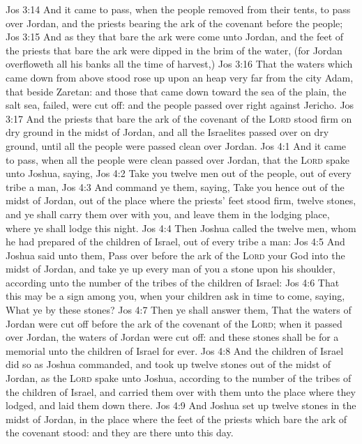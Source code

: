 \vs Jos 3:14 And it came to pass, when the people removed from their tents, to pass over Jordan, and the priests bearing the ark of the covenant before the people;
\vs Jos 3:15 And as they that bare the ark were come unto Jordan, and the feet of the priests that bare the ark were dipped in the brim of the water, (for Jordan overfloweth all his banks all the time of harvest,)
\vs Jos 3:16 That the waters which came down from above stood  rose up upon an heap very far from the city Adam, that  beside Zaretan: and those that came down toward the sea of the plain,  the salt sea, failed,  were cut off: and the people passed over right against Jericho.
\vs Jos 3:17 And the priests that bare the ark of the covenant of the \textsc{Lord} stood firm on dry ground in the midst of Jordan, and all the Israelites passed over on dry ground, until all the people were passed clean over Jordan.
\vs Jos 4:1 And it came to pass, when all the people were clean passed over Jordan, that the \textsc{Lord} spake unto Joshua, saying,
\vs Jos 4:2 Take you twelve men out of the people, out of every tribe a man,
\vs Jos 4:3 And command ye them, saying, Take you hence out of the midst of Jordan, out of the place where the priests' feet stood firm, twelve stones, and ye shall carry them over with you, and leave them in the lodging place, where ye shall lodge this night.
\vs Jos 4:4 Then Joshua called the twelve men, whom he had prepared of the children of Israel, out of every tribe a man:
\vs Jos 4:5 And Joshua said unto them, Pass over before the ark of the \textsc{Lord} your God into the midst of Jordan, and take ye up every man of you a stone upon his shoulder, according unto the number of the tribes of the children of Israel:
\vs Jos 4:6 That this may be a sign among you,  when your children ask  in time to come, saying, What  ye by these stones?
\vs Jos 4:7 Then ye shall answer them, That the waters of Jordan were cut off before the ark of the covenant of the \textsc{Lord}; when it passed over Jordan, the waters of Jordan were cut off: and these stones shall be for a memorial unto the children of Israel for ever.
\vs Jos 4:8 And the children of Israel did so as Joshua commanded, and took up twelve stones out of the midst of Jordan, as the \textsc{Lord} spake unto Joshua, according to the number of the tribes of the children of Israel, and carried them over with them unto the place where they lodged, and laid them down there.
\vs Jos 4:9 And Joshua set up twelve stones in the midst of Jordan, in the place where the feet of the priests which bare the ark of the covenant stood: and they are there unto this day.
